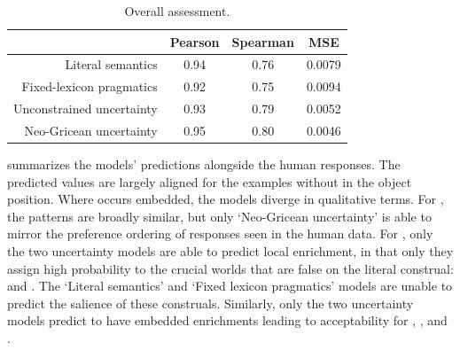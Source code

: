 \documentclass[leqno]{article}
\begin{document}
\begin{table}[t]
  \centering
  \begin{tabular}[c]{r c c c}
    \toprule
    & Pearson & Spearman & MSE \\
    \midrule
    Literal semantics         & 0.94 & 0.76 & 0.0079\\
    Fixed-lexicon pragmatics  & 0.92 & 0.75 & 0.0094\\
    Unconstrained uncertainty & 0.93 & 0.79 & 0.0052\\
    Neo-Gricean uncertainty   & 0.95 & 0.80 & 0.0046\\
    \bottomrule   
  \end{tabular}
  \caption{Overall assessment.}
  \label{tab:overall}
\end{table}

 summarizes the models' predictions alongside
the human responses. The predicted values are largely aligned for the
examples without  in the object position. Where 
occurs embedded, the models diverge in qualitative terms. For
, the patterns are broadly similar, but only
`Neo-Gricean uncertainty' is able to mirror the preference ordering of
responses seen in the human data. For , only
the two uncertainty models are able to predict local enrichment, in
that only they assign high probability to the crucial worlds that are
false on the literal construal:  and . The
`Literal semantics' and `Fixed lexicon pragmatics' models are unable
to predict the salience of these construals. Similarly, only the two
uncertainty models predict  to have embedded
enrichments leading to acceptability for , , and
.

\end{document}

